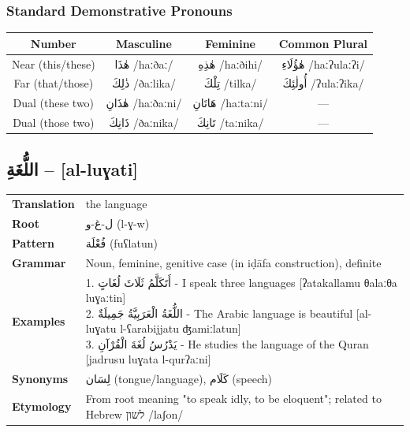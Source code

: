 \documentclass[letterpaper,12pt]{article}
\begin{document}
\subsubsection*{Standard Demonstrative Pronouns}

\begin{tabular}{|c|c|c|c|}
\hline
\textbf{Number} & \textbf{Masculine} & \textbf{Feminine} & \textbf{Common Plural} \\
\hline
Near (this/these) & \textarabic{هٰذَا} /haːðaː/ & \textarabic{هٰذِهِ} /haːðihi/ & \textarabic{هٰؤُلَاءِ} /haːʔulaːʔi/ \\
\hline
Far (that/those) & \textarabic{ذٰلِكَ} /ðaːlika/ & \textarabic{تِلْكَ} /tilka/ & \textarabic{أُولٰئِكَ} /ʔulaːʔika/ \\
\hline
Dual (these two) & \textarabic{هٰذَانِ} /haːðaːni/ & \textarabic{هَاتَانِ} /haːtaːni/ & — \\
\hline
Dual (those two) & \textarabic{ذَانِكَ} /ðaːnika/ & \textarabic{تَانِكَ} /taːnika/ & — \\
\hline
\end{tabular}

\subsection{\textarabic{اللُّغَةِ} – [al-luɣati]}

\begin{tabular}{p{3cm}p{10cm}}
\toprule
\textbf{Translation} & the language \\
\textbf{Root} & \textarabic{ل-غ-و} (l-ɣ-w) \\
\textbf{Pattern} & \textarabic{فُعْلَة} (fuʕlatun) \\
\textbf{Grammar} & Noun, feminine, genitive case (in iḍāfa construction), definite \\
\midrule
\textbf{Examples} & \makecell[l]{\parbox{9.5cm}{
1. \textarabic{أَتَكَلَّمُ ثَلَاثَ لُغَاتٍ} - I speak three languages [ʔatakallamu θalaːθa luɣaːtin]\\
2. \textarabic{اللُّغَةُ الْعَرَبِيَّةُ جَمِيلَةٌ} - The Arabic language is beautiful [al-luɣatu l-ʕarabijjatu ʤamiːlatun]\\
3. \textarabic{يَدْرُسُ لُغَةَ الْقُرْآنِ} - He studies the language of the Quran [jadrusu luɣata l-qurʔaːni]
}} \\
\midrule
\textbf{Synonyms} & \textarabic{لِسَان} (tongue/language), \textarabic{كَلَام} (speech) \\
\textbf{Etymology} & From root meaning "to speak idly, to be eloquent"; related to Hebrew \texthebrew{לשון} /laʃon/ \\
\bottomrule
\end{tabular}
\end{document}
